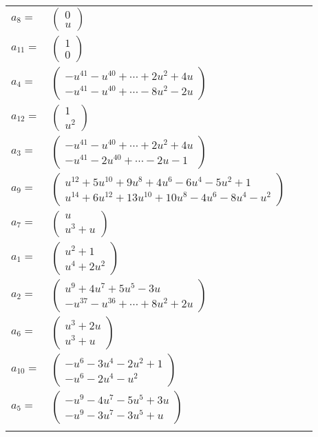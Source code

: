 \documentclass[1p]{elsarticle_modified}
\theoremstyle{definition}
\begin{document}
\begin{tabular}{m{7pt} m{180pt} m{7pt} m{180pt} }
\flushright $a_{8}=$&$\begin{pmatrix}0\\u\end{pmatrix}$ \\
\flushright $a_{11}=$&$\begin{pmatrix}1\\0\end{pmatrix}$ \\
\flushright $a_{4}=$&$\begin{pmatrix}- u^{41}- u^{40}+\cdots+2 u^2+4 u\\- u^{41}- u^{40}+\cdots-8 u^2-2 u\end{pmatrix}$ \\
\flushright $a_{12}=$&$\begin{pmatrix}1\\u^2\end{pmatrix}$ \\
\flushright $a_{3}=$&$\begin{pmatrix}- u^{41}- u^{40}+\cdots+2 u^2+4 u\\- u^{41}-2 u^{40}+\cdots-2 u-1\end{pmatrix}$ \\
\flushright $a_{9}=$&$\begin{pmatrix}u^{12}+5 u^{10}+9 u^8+4 u^6-6 u^4-5 u^2+1\\u^{14}+6 u^{12}+13 u^{10}+10 u^8-4 u^6-8 u^4- u^2\end{pmatrix}$ \\
\flushright $a_{7}=$&$\begin{pmatrix}u\\u^3+u\end{pmatrix}$ \\
\flushright $a_{1}=$&$\begin{pmatrix}u^2+1\\u^4+2 u^2\end{pmatrix}$ \\
\flushright $a_{2}=$&$\begin{pmatrix}u^9+4 u^7+5 u^5-3 u\\- u^{37}- u^{36}+\cdots+8 u^2+2 u\end{pmatrix}$ \\
\flushright $a_{6}=$&$\begin{pmatrix}u^3+2 u\\u^3+u\end{pmatrix}$ \\
\flushright $a_{10}=$&$\begin{pmatrix}- u^6-3 u^4-2 u^2+1\\- u^6-2 u^4- u^2\end{pmatrix}$ \\
\flushright $a_{5}=$&$\begin{pmatrix}- u^9-4 u^7-5 u^5+3 u\\- u^9-3 u^7-3 u^5+u\end{pmatrix}$\\&\end{tabular}
\end{document}
